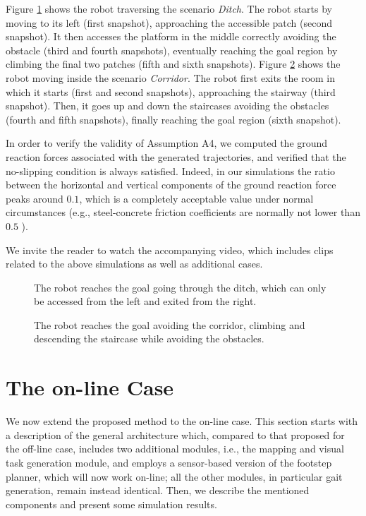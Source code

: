 Figure \ref{fig:offlineCase:Ditch:Snapshots} shows the robot traversing the scenario \textit{Ditch}. The robot starts by moving to its left (first snapshot), approaching the accessible patch (second snapshot). It then accesses the platform in the middle correctly avoiding the obstacle (third and fourth snapshots), eventually reaching the goal region by climbing the final two patches (fifth and sixth snapshots).
Figure \ref{fig:offlineCase:Corridor:Snapshots} shows the robot moving inside the scenario \textit{Corridor}. The robot first exits the room in which it starts (first and second snapshots), approaching the stairway (third snapshot). Then, it goes up and down the staircases avoiding the obstacles (fourth and fifth snapshots), finally reaching the goal region (sixth snapshot).

In order to verify the validity of Assumption A4, we computed the ground reaction forces associated with the generated trajectories, and verified that the no-slipping condition is always satisfied. Indeed, in our simulations the ratio between the horizontal and vertical components of the ground reaction force peaks around $0.1$, which is a completely acceptable value under normal circumstances (e.g., steel-concrete friction coefficients are normally not lower than $0.5$ \cite{Rabbat1985Friction}).


We invite the reader to watch the accompanying video, %
which includes clips related to the above simulations as well as additional cases.

\begin{figure}
    \OfflineDitch
    \caption{The robot reaches the goal going through the ditch, which can only be accessed from the left and exited from the right.}
    \label{fig:offlineCase:Ditch:Snapshots}
\end{figure}
\begin{figure}
    \OfflineCorridor
    \caption{The robot reaches the goal avoiding the
    corridor, climbing and descending the staircase while
    avoiding the obstacles.}
    \label{fig:offlineCase:Corridor:Snapshots}
\end{figure}


\section{The on-line Case} 
\label{sec:onlineCase}

We now extend the proposed method to the on-line case.
This section starts with a description of the general architecture which, compared to that proposed for the off-line case, includes two additional modules, i.e., the mapping and visual task generation module, and employs a sensor-based version of the footstep planner, which will now work on-line; all the other modules, in particular gait generation, remain instead identical.  
Then, we describe the mentioned components and present some simulation results.

